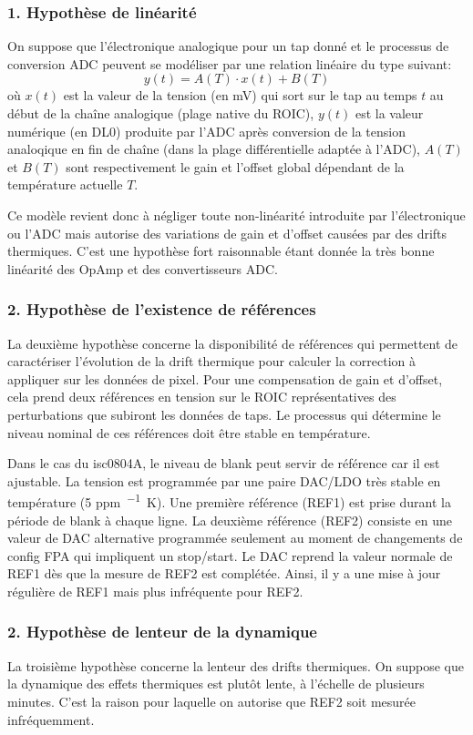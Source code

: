 \documentclass[11pt]{report}
\begin{document}
\subsubsection{1. Hypothèse de linéarité}
On suppose que l'électronique analogique pour un tap donné et le processus de conversion ADC peuvent se modéliser par une relation linéaire du type suivant:
\[y(t) = A(T)\cdot{}x(t) + B(T)\]
où $x(t)$ est la valeur de la tension (en \unit{mV}) qui sort sur le tap au temps $t$ au début de la chaîne analogique (plage native du ROIC), $y(t)$ est la valeur numérique (en DL0) produite par l'ADC après conversion de la tension analoqique en fin de chaîne (dans la plage différentielle adaptée à l'ADC), $A(T)$ et $B(T)$ sont respectivement le gain et l'offset global dépendant de la température actuelle $T$.

Ce modèle revient donc à négliger toute non-linéarité introduite par l'électronique ou l'ADC mais autorise des variations de gain et d'offset causées par des drifts thermiques. C'est une hypothèse fort raisonnable étant donnée la très bonne linéarité des OpAmp et des convertisseurs ADC.

\subsubsection{2. Hypothèse de l'existence de références}
La deuxième hypothèse concerne la disponibilité de références qui permettent de caractériser l'évolution de la drift thermique pour calculer la correction à appliquer sur les données de pixel. Pour une compensation de gain et d'offset, cela prend deux références en tension sur le ROIC représentatives des perturbations que subiront les données de taps. Le processus qui détermine le niveau nominal de ces références doit être stable en température.

Dans le cas du isc0804A, le niveau de blank peut servir de référence car il est ajustable. La tension est programmée par une paire DAC/LDO très stable en température (\num{5} \unit{ppm\per{}K}). Une première référence (REF1) est prise durant la période de blank à chaque ligne. La deuxième référence (REF2) consiste en une valeur de DAC alternative programmée seulement au moment de changements de config FPA qui impliquent un stop/start. Le DAC reprend la valeur normale de REF1 dès que la mesure de REF2 est complétée. Ainsi, il y a une mise à jour régulière de REF1 mais plus infréquente pour REF2.

\subsubsection{2. Hypothèse de lenteur de la dynamique}
La troisième hypothèse concerne la lenteur des drifts thermiques. On suppose que la dynamique des effets thermiques est plutôt lente, à l'échelle de plusieurs minutes. C'est la raison pour laquelle on autorise que REF2 soit mesurée infréquemment.
\end{document}
